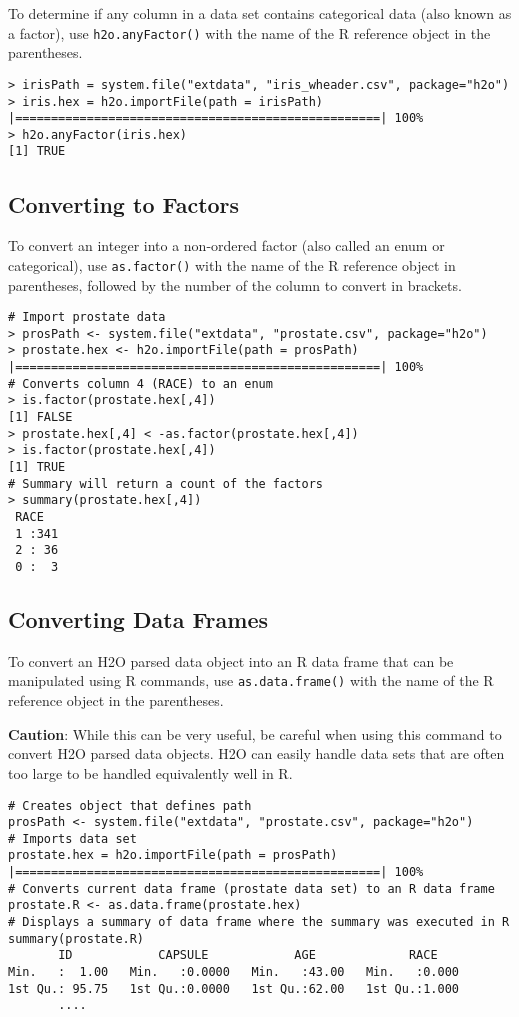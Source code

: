 {To determine if any column in a data set contains categorical data (also known as a factor), use {\texttt{h2o.anyFactor()}} with the name of the R reference object in the parentheses.
\begin{lstlisting}[style=R]
> irisPath = system.file("extdata", "iris_wheader.csv", package="h2o")
> iris.hex = h2o.importFile(path = irisPath)
|===================================================| 100%
> h2o.anyFactor(iris.hex)
[1] TRUE
\end{lstlisting}

\subsection{Converting to Factors}
To convert an integer into a non-ordered factor (also called an enum or categorical), use {\texttt{as.factor()}} with the name of the R reference object in parentheses, followed by the number of the column to convert in brackets.

\begin{lstlisting}[style=R]
# Import prostate data
> prosPath <- system.file("extdata", "prostate.csv", package="h2o")
> prostate.hex <- h2o.importFile(path = prosPath)
|===================================================| 100%
# Converts column 4 (RACE) to an enum
> is.factor(prostate.hex[,4])
[1] FALSE
> prostate.hex[,4] < -as.factor(prostate.hex[,4])
> is.factor(prostate.hex[,4])
[1] TRUE
# Summary will return a count of the factors
> summary(prostate.hex[,4])
 RACE   
 1 :341 
 2 : 36 
 0 :  3 
\end{lstlisting}

\subsection{Converting Data Frames}

\normalsize

To convert an H2O parsed data object into an R data frame that can be manipulated using R commands, use {\texttt{as.data.frame()}} with the name of the R reference object in the parentheses.

{\textbf{Caution}}: While this can be very useful, be careful when using this command to convert H2O parsed data objects. H2O can easily handle data sets that are often too large to be handled equivalently well in R. 
\small
\begin{lstlisting}[style=R]
# Creates object that defines path
prosPath <- system.file("extdata", "prostate.csv", package="h2o")
# Imports data set
prostate.hex = h2o.importFile(path = prosPath)
|===================================================| 100%
# Converts current data frame (prostate data set) to an R data frame
prostate.R <- as.data.frame(prostate.hex)
# Displays a summary of data frame where the summary was executed in R
summary(prostate.R) 
       ID            CAPSULE            AGE             RACE
Min.   :  1.00   Min.   :0.0000   Min.   :43.00   Min.   :0.000
1st Qu.: 95.75   1st Qu.:0.0000   1st Qu.:62.00   1st Qu.:1.000
       .... 
\end{lstlisting}
\newpage

}

